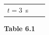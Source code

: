 {{\begin{center}
\begin{tabular}[t]{|l|l|l|}
    
     \tabularnewline\cline{1-1}\cline{2-2}\cline{3-3}
    
    
        \begin{math}t=3\end{math}~s &
    
    
         &
    
    
     \tabularnewline\cline{1-1}\cline{2-2}\cline{3-3}
    \end{tabular}
      \end{center}
    \begin{center}{\small\bfseries Table 6.1}\end{center}
    
    \addtocounter{footnote}{-0}
    
          }{ %
        
    
        \begin{center}
      
      \label{m38801*id313027}
      
    \noindent
      \tablelasttail{}
      \begin{xtabular}[t]{|l|l|l|}\hline
    

\end{xtabular}
\end{center}}}
